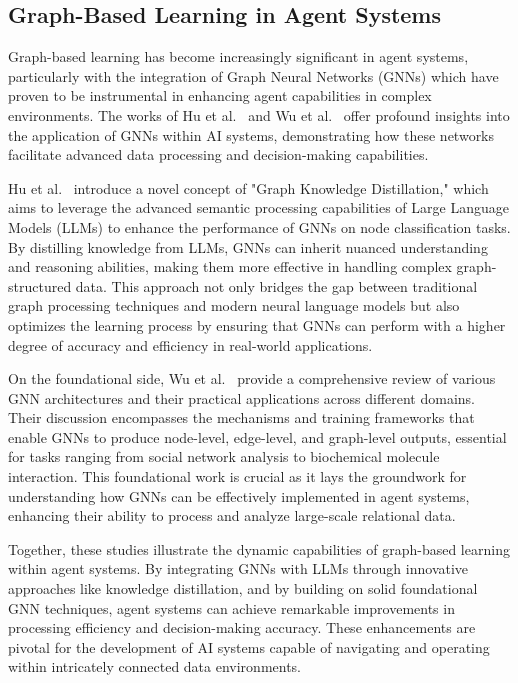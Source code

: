 \subsection{Graph-Based Learning in Agent Systems}
Graph-based learning has become increasingly significant in agent systems, particularly with the integration of Graph Neural Networks (GNNs) which have proven to be instrumental in enhancing agent capabilities in complex environments. The works of Hu et al.~\cite{hu2024large} and Wu et al.~\cite{wu2021} offer profound insights into the application of GNNs within AI systems, demonstrating how these networks facilitate advanced data processing and decision-making capabilities.

Hu et al.~\cite{hu2024large} introduce a novel concept of "Graph Knowledge Distillation," which aims to leverage the advanced semantic processing capabilities of Large Language Models (LLMs) to enhance the performance of GNNs on node classification tasks. By distilling knowledge from LLMs, GNNs can inherit nuanced understanding and reasoning abilities, making them more effective in handling complex graph-structured data. This approach not only bridges the gap between traditional graph processing techniques and modern neural language models but also optimizes the learning process by ensuring that GNNs can perform with a higher degree of accuracy and efficiency in real-world applications.

On the foundational side, Wu et al.~\cite{wu2021} provide a comprehensive review of various GNN architectures and their practical applications across different domains. Their discussion encompasses the mechanisms and training frameworks that enable GNNs to produce node-level, edge-level, and graph-level outputs, essential for tasks ranging from social network analysis to biochemical molecule interaction. This foundational work is crucial as it lays the groundwork for understanding how GNNs can be effectively implemented in agent systems, enhancing their ability to process and analyze large-scale relational data.

Together, these studies illustrate the dynamic capabilities of graph-based learning within agent systems. By integrating GNNs with LLMs through innovative approaches like knowledge distillation, and by building on solid foundational GNN techniques, agent systems can achieve remarkable improvements in processing efficiency and decision-making accuracy. These enhancements are pivotal for the development of AI systems capable of navigating and operating within intricately connected data environments.


